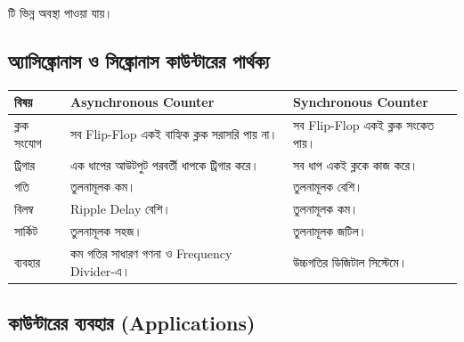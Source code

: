 টি ভিন্ন অবস্থা পাওয়া যায়।



\subsection{অ্যাসিঙ্ক্রোনাস ও সিঙ্ক্রোনাস কাউন্টারের পার্থক্য}

\begin{center}
\renewcommand{\arraystretch}{1.25}

\begin{tabularx}
{\textwidth}
{|L{0.21\textwidth}|Y|Y|}

\hline


\textbf{বিষয়}
&
\textbf{\textenglish{Asynchronous Counter}}
&
\textbf{\textenglish{Synchronous Counter}}
\\
\hline

ক্লক সংযোগ
&
সব \textenglish{Flip-Flop} একই বাহ্যিক ক্লক সরাসরি পায় না।
&
সব \textenglish{Flip-Flop} একই ক্লক সংকেত পায়।
\\
\hline

ট্রিগার
&
এক ধাপের আউটপুট পরবর্তী ধাপকে ট্রিগার করে।
&
সব ধাপ একই ক্লকে কাজ করে।
\\
\hline

গতি
&
তুলনামূলক কম।
&
তুলনামূলক বেশি।
\\
\hline

বিলম্ব
&
\textenglish{Ripple Delay} বেশি।
&
তুলনামূলক কম।
\\
\hline

সার্কিট
&
তুলনামূলক সহজ।
&
তুলনামূলক জটিল।
\\
\hline

ব্যবহার
&
কম গতির সাধারণ গণনা ও
\textenglish{Frequency Divider}-এ।
&
উচ্চগতির ডিজিটাল সিস্টেমে।
\\
\hline

\end{tabularx}
\end{center}



\subsection{কাউন্টারের ব্যবহার
(\textenglish{Applications})}

